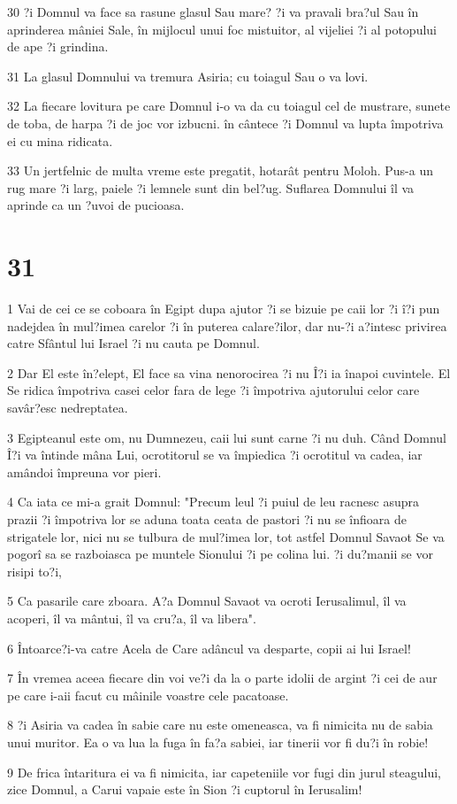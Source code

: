 \par 30 ?i Domnul va face sa rasune glasul Sau mare? ?i va pravali bra?ul Sau în aprinderea mâniei Sale, în mijlocul unui foc mistuitor, al vijeliei ?i al potopului de ape ?i grindina.
\par 31 La glasul Domnului va tremura Asiria; cu toiagul Sau o va lovi.
\par 32 La fiecare lovitura pe care Domnul i-o va da cu toiagul cel de mustrare, sunete de toba, de harpa ?i de joc vor izbucni. în cântece ?i Domnul va lupta împotriva ei cu mina ridicata.
\par 33 Un jertfelnic de multa vreme este pregatit, hotarât pentru Moloh. Pus-a un rug mare ?i larg, paiele ?i lemnele sunt din bel?ug. Suflarea Domnului îl va aprinde ca un ?uvoi de pucioasa.

\chapter{31}

\par 1 Vai de cei ce se coboara în Egipt dupa ajutor ?i se bizuie pe caii lor ?i î?i pun nadejdea în mul?imea carelor ?i în puterea calare?ilor, dar nu-?i a?intesc privirea catre Sfântul lui Israel ?i nu cauta pe Domnul.
\par 2 Dar El este în?elept, El face sa vina nenorocirea ?i nu Î?i ia înapoi cuvintele. El Se ridica împotriva casei celor fara de lege ?i împotriva ajutorului celor care savâr?esc nedreptatea.
\par 3 Egipteanul este om, nu Dumnezeu, caii lui sunt carne ?i nu duh. Când Domnul Î?i va întinde mâna Lui, ocrotitorul se va împiedica ?i ocrotitul va cadea, iar amândoi împreuna vor pieri.
\par 4 Ca iata ce mi-a grait Domnul: "Precum leul ?i puiul de leu racnesc asupra prazii ?i împotriva lor se aduna toata ceata de pastori ?i nu se înfioara de strigatele lor, nici nu se tulbura de mul?imea lor, tot astfel Domnul Savaot Se va pogorî sa se razboiasca pe muntele Sionului ?i pe colina lui. ?i du?manii se vor risipi to?i,
\par 5 Ca pasarile care zboara. A?a Domnul Savaot va ocroti Ierusalimul, îl va acoperi, îl va mântui, îl va cru?a, îl va libera".
\par 6 Întoarce?i-va catre Acela de Care adâncul va desparte, copii ai lui Israel!
\par 7 În vremea aceea fiecare din voi ve?i da la o parte idolii de argint ?i cei de aur pe care i-aii facut cu mâinile voastre cele pacatoase.
\par 8 ?i Asiria va cadea în sabie care nu este omeneasca, va fi nimicita nu de sabia unui muritor. Ea o va lua la fuga în fa?a sabiei, iar tinerii vor fi du?i în robie!
\par 9 De frica întaritura ei va fi nimicita, iar capeteniile vor fugi din jurul steagului, zice Domnul, a Carui vapaie este în Sion ?i cuptorul în Ierusalim!

